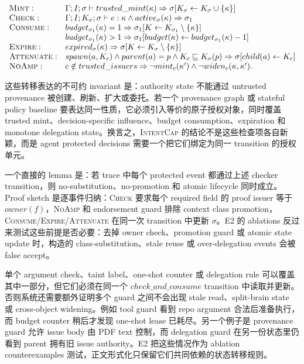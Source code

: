 \documentclass[UTF8,a4paper,11pt]{ctexart}
\newcommand{\sys}{\textsc{IntentCap}\xspace}
\begin{document}
\[
\begin{array}{ll}
\textsc{Mint}:&
  \Gamma;I;\sigma \vdash trusted\_mint(\kappa)
  \Rightarrow \sigma[K_\sigma \leftarrow K_\sigma \cup \{\kappa\}] \\
\textsc{Check}:&
  \Gamma;I;K_\sigma;\sigma \vdash e:\kappa
  \land active_\sigma(\kappa)
  \Rightarrow \sigma_1 \\
\textsc{Consume}:&
  budget_{\sigma_1}(\kappa)=1
  \Rightarrow \sigma_1[K \leftarrow K_{\sigma_1}\setminus\{\kappa\}] \\
&
  budget_{\sigma_1}(\kappa)>1
  \Rightarrow \sigma_1[budget(\kappa)\leftarrow budget_{\sigma_1}(\kappa)-1] \\
\textsc{Expire}:&
  expired_\sigma(\kappa)
  \Rightarrow \sigma[K \leftarrow K_\sigma\setminus\{\kappa\}] \\
\textsc{Attenuate}:&
  spawn(a,K_c) \land parent(a)=p \land K_c \sqsubseteq K_{\sigma}(p)
  \Rightarrow \sigma[child(a)\leftarrow K_c] \\
\textsc{NoAmp}:&
  c \notin trusted\_issuers
  \Rightarrow \neg mint_c(\kappa') \land \neg widen_c(\kappa,\kappa').
\end{array}
\]

这些转移表达的不可约 invariant 是：authority state 不能通过 untrusted provenance 被创建、刷新、扩大或委托。若一个 provenance graph 或 stateful policy baseline 要表达同一性质，它必须引入等价的原子授权对象，同时覆盖 trusted mint、decision-specific influence、budget consumption、expiration 和 monotone delegation state。换言之，\sys 的结论不是这些检查项各自新颖，而是 agent protected decisions 需要一个把它们绑定为同一 transition 的授权单元。

一个直接的 lemma 是：若 trace 中每个 protected event 都通过上述 checker transition，则 no-substitution、no-promotion 和 atomic lifecycle 同时成立。Proof sketch 是逐事件归纳：\textsc{Check} 要求每个 required field 的 proof issuer 等于 \(owner(f)\)，\textsc{NoAmp} 和 endorsement guard 排除 context class promotion，\textsc{Consume}/\textsc{Expire}/\textsc{Attenuate} 在同一次 transition 中更新 \(\sigma\)。E2 的 ablations 反过来测试这些前提是否必要：去掉 owner check、promotion guard 或 atomic state update 时，构造的 class-substitution、stale reuse 或 over-delegation events 会被 false accept。

单个 argument check、taint label、one-shot counter 或 delegation rule 可以覆盖其中一部分，但它们必须在同一个 \(check\_and\_consume\) transition 中读取并更新。否则系统还需要额外证明多个 guard 之间不会出现 stale read、split-brain state 或 cross-object widening。例如 tool guard 看到 repo argument 合法后准备执行，而 budget counter 稍后才发现 one-shot lease 已耗尽。另一个例子是 provenance guard 允许 issue body 由 PDF text 控制，而 delegation guard 在另一份状态里仍看到 parent 拥有旧 issue authority。E2 把这些情况作为 ablation counterexamples 测试，正文形式化只保留它们共同依赖的状态转移规则。
\end{document}
